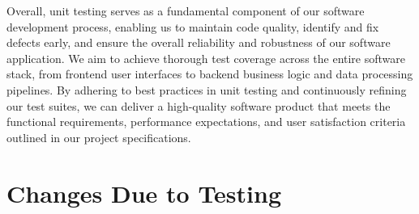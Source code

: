 \documentclass[12pt, titlepage]{article}
\begin{document}
Overall, unit testing serves as a fundamental component of our software development process, enabling us to maintain code quality, identify and fix defects early, and ensure the overall reliability and robustness of our software application. We aim to achieve thorough test coverage across the entire software stack, from frontend user interfaces to backend business logic and data processing pipelines. By adhering to best practices in unit testing and continuously refining our test suites, we can deliver a high-quality software product that meets the functional requirements, performance expectations, and user satisfaction criteria outlined in our project specifications.

\section{Changes Due to Testing}
\end{document}
